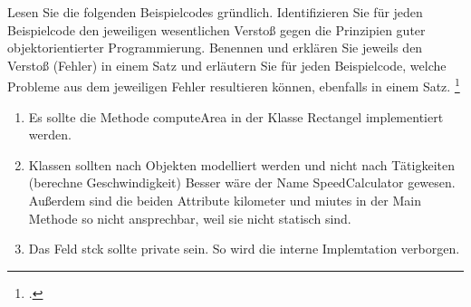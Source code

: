 \documentclass{bschlangaul-aufgabe}
\begin{document}

Lesen Sie die folgenden Beispielcodes gründlich. Identifizieren Sie für
jeden Beispielcode den jeweiligen wesentlichen Verstoß gegen die
Prinzipien guter objektorientierter Programmierung. Benennen und
erklären Sie jeweils den Verstoß (Fehler) in einem Satz und erläutern
Sie für jeden Beispielcode, welche Probleme aus dem jeweiligen Fehler
resultieren können, ebenfalls in einem Satz.
\footcite{examen:66116:2021:03}

\begin{enumerate}
\item {}

\begin{liAntwort}
Es sollte die Methode computeArea in der Klasse Rectangel implementiert
werden.
\end{liAntwort}

\item {}

\begin{liAntwort}
Klassen sollten nach Objekten modelliert werden und nicht nach
Tätigkeiten (berechne Geschwindigkeit) Besser wäre der Name
SpeedCalculator gewesen. Außerdem sind die beiden Attribute kilometer
und miutes in der Main Methode so nicht ansprechbar, weil sie nicht
statisch sind.
\end{liAntwort}

\item {}

\begin{liAntwort}
Das Feld stck sollte private sein. So wird die interne Implemtation
verborgen.
\end{liAntwort}
\end{enumerate}
\end{document}
